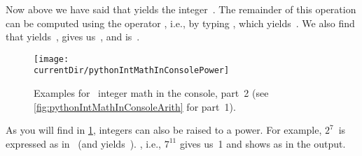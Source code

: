 
Now above we have said that  yields the integer~.
The remainder of this operation can be computed using the  operator \expandafter\pythonilIdx{\%}, i.e., by typing , which yields~.
We also find that \expandafter{} yields~, \expandafter{} gives us~, and \expandafter{} is~.

\begin{figure}%
\centering%
\texttt{[image: \\currentDir/pythonIntMathInConsolePower]}%
\caption{Examples for \python\ integer math in the console, part~2 (see \cref{fig:pythonIntMathInConsoleArith} for part~1).}%
\label{fig:pythonIntMathInConsolePower}%
\end{figure}%

As you will find in \cref{fig:pythonIntMathInConsolePower}, integers can also be raised to a power.
For example, $2^7$~is expressed as \pythonIdx{**} in \python\ (and yields~).
, i.e., $7^{11}$ gives us~1 and shows as  in the output.

